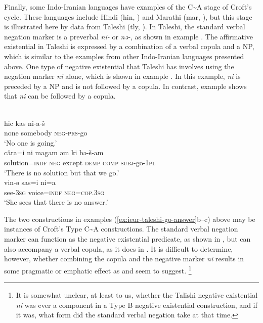 \documentclass[output=paper,colorlinks,citecolor=brown]{langscibook}
\begin{document}
Finally, some Indo-Iranian languages have examples of the
C{\textasciitilde}A stage of Croft's cycle. These languages include
Hindi (hin, \citealt{Bashir2006}) and Marathi (mar,
\citealt{Croft1991}), but this stage is illustrated here by data from
Taleshi (tly, \citealt{Paul2011}). In Taleshi, the standard
verbal negation marker is a preverbal \textit{ni-} or
\textit{nə-}, as shown in example . The affirmative
existential in Taleshi is expressed by a combination of a verbal copula and
a NP, which is similar to the examples from other Indo-Iranian languages
presented above. One type of negative existential that Taleshi has involves
using the negation marker \textit{ni} alone, which is shown in example
. In this example, \textit{ni} is preceded
by a NP and is not followed by a copula. In contrast, example
 shows that \textit{ni} can be followed
by a copula.
%
\begin{exe}\ex\label{ex:ieur-taleshi-go-answer}
\begin{xlist}
\ex\label{ex:ieur-taleshi-nobodygoes}
\\
    \gll hic kas ni-a-š \\
none somebody \textsc{neg}-\textsc{prs}-go \\
    \glt
`No one is going.'
\ex\label{ex:ieur-taleshi-nosolution}
\\
\gll câra=i ni magam əm ki bə-š-am\\
solution=\textsc{indf} \textsc{neg} except \textsc{demp} \textsc{comp}
\textsc{subj}-go-\textsc{1pl}\\
\glt `There is no solution but that we go.'
\ex\label{ex:ieur-taleshi-noanswer}
\\
\gll vin-ə sas=i ni=a\\
see-\textsc{3sg} voice=\textsc{indf}  \textsc{neg=cop.3sg}\\
\glt `She sees that there is no answer.'
    \end{xlist}\end{exe}

The two constructions in examples (\ref{ex:ieur-taleshi-go-answer}b--c)
above may be instances of Croft's Type C{\textasciitilde}A constructions.
The standard verbal negation marker can function as the negative
existential predicate, as shown in , but can
also accompany a verbal copula, as it does in
. It is difficult to determine, however,
whether combining the copula and the negative marker \textit{ni} results in
some pragmatic or emphatic effect as \citet{Croft1991} and
\citet{Veselinova2014} seem to suggest.%
%
\footnote{It is somewhat unclear, at least to us, whether the Talishi negative existential \textit{ni} was ever a component in a Type B negative existential construction, and if it was, what form did the standard verbal negation take at that time.}
\end{document}

